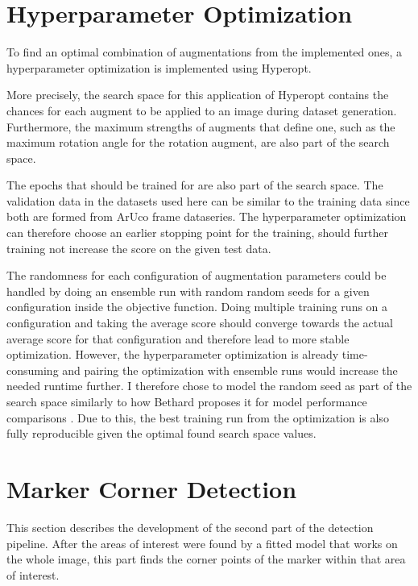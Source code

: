 \documentclass[10pt]{book}
\begin{document}
\section{Hyperparameter Optimization}
\label{sec:hyper_opt}

To find an optimal combination of augmentations from the implemented ones, a hyperparameter optimization is implemented using Hyperopt. 

More precisely, the search space for this application of Hyperopt contains the chances for each augment to be applied to an image during dataset generation. Furthermore, the maximum strengths of augments that define one, such as the maximum rotation angle for the rotation augment, are also part of the search space. 

The epochs that should be trained for are also part of the search space. The validation data in the datasets used here can be similar to the training data since both are formed from \ac{ArUco} frame dataseries. The hyperparameter optimization can therefore choose an earlier stopping point for the training, should further training not increase the score on the given test data. 


The randomness for each configuration of augmentation parameters could be handled by %
doing an ensemble run with random random seeds for a given configuration inside the objective function. Doing multiple training runs on a configuration and taking the average score should converge towards the actual average score for that configuration and therefore lead to more stable optimization. However, the hyperparameter optimization is already time-consuming and pairing the optimization with ensemble runs would increase the needed runtime further. I therefore chose to model the random seed as part of the search space similarly to how Bethard proposes it for model performance comparisons \cite{bethard2022need}. Due to this, the best training run from the optimization is also fully reproducible given the optimal found search space values. 

\section{Marker Corner Detection}

This section describes the development of the second part of the detection pipeline. After the areas of interest were found by a fitted model that works on the whole image, this part finds the corner points of the marker within that area of interest.
\end{document}
